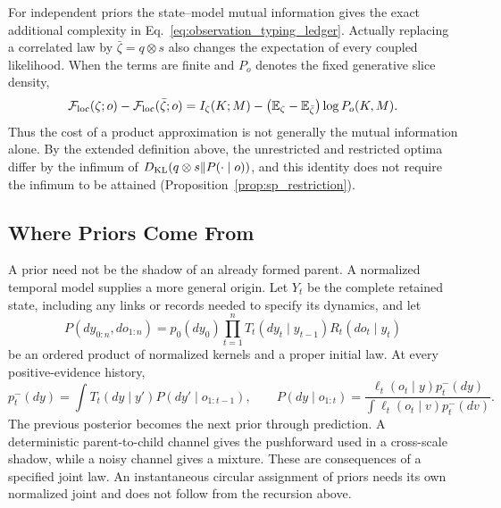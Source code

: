 For independent priors the state--model mutual information gives the exact additional complexity in Eq.~\eqref{eq:observation_typing_ledger}. Actually replacing a correlated law by $\bar\zeta=q\otimes s$ also changes the expectation of every coupled likelihood. When the terms are finite and $P_o$ denotes the fixed generative slice density,
\begin{equation}
\mathcal F_{\rm loc}(\zeta;o)-\mathcal F_{\rm loc}(\bar\zeta;o)
=I_\zeta(K;M)-\bigl(\mathbb E_\zeta-\mathbb E_{\bar\zeta}\bigr)\log P_o(K,M).
\label{eq:one_law_product_residual}
\end{equation}
Thus the cost of a product approximation is not generally the mutual information alone. By the extended definition above, the unrestricted and restricted optima differ by the infimum of $D_{\rm KL}(q\otimes s\Vert P(\cdot\mid o))$, and this identity does not require the infimum to be attained (Proposition~\ref{prop:sp_restriction}).

\subsection{Where Priors Come From}
\label{sec:predictive_prior_origin}

A prior need not be the shadow of an already formed parent. A normalized temporal model supplies a more general origin. Let $Y_t$ be the complete retained state, including any links or records needed to specify its dynamics, and let
\begin{equation}
P(dy_{0:n},do_{1:n})=p_0(dy_0)\prod_{t=1}^n
T_t(dy_t\mid y_{t-1})R_t(do_t\mid y_t)
\label{eq:one_law_temporal_joint}
\end{equation}
be an ordered product of normalized kernels and a proper initial law. At every positive-evidence history,
\begin{equation}
p_t^-(dy)=\int T_t(dy\mid y')P(dy'\mid o_{1:t-1}),
\qquad
P(dy\mid o_{1:t})=\frac{\ell_t(o_t\mid y)p_t^-(dy)}{\int\ell_t(o_t\mid v)p_t^-(dv)}.
\label{eq:one_law_predictive_prior}
\end{equation}
The previous posterior becomes the next prior through prediction. A deterministic parent-to-child channel gives the pushforward used in a cross-scale shadow, while a noisy channel gives a mixture. These are consequences of a specified joint law. An instantaneous circular assignment of priors needs its own normalized joint and does not follow from the recursion above.

